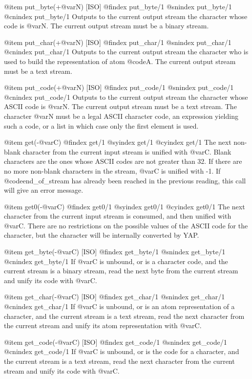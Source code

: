 {{{{{{@item put_byte(+@var{N}) [ISO]
@findex put_byte/1
@snindex put_byte/1
@cnindex put_byte/1
Outputs to the current output stream the character whose code is
@var{N}. The current output stream must be a binary stream.

@item put_char(+@var{N}) [ISO]
@findex put_char/1
@snindex put_char/1
@cnindex put_char/1
Outputs to the current output stream the character who is used to build
the representation of atom @code{A}. The current output stream must be a
text stream.

@item put_code(+@var{N}) [ISO]
@findex put_code/1
@snindex put_code/1
@cnindex put_code/1
Outputs to the current output stream the character whose ASCII code is
@var{N}. The current output stream must be a text stream. The character
@var{N} must be a legal ASCII character code, an expression yielding such
a code, or a list in which case only the first element is used.

@item get(-@var{C})
@findex get/1
@syindex get/1
@cyindex get/1
The next non-blank character from the current input stream is unified
with @var{C}. Blank characters are the ones whose ASCII codes are not
greater than 32. If there are no more non-blank characters in the
stream, @var{C} is unified with -1. If @code{end_of_stream} has already
been reached in the previous reading, this call will give an error message.

@item get0(-@var{C})
@findex get0/1
@syindex get0/1
@cyindex get0/1
The next character from the current input stream is consumed, and then
unified with @var{C}. There are no restrictions on the possible
values of the ASCII code for the character, but the character will be
internally converted by YAP.

@item get_byte(-@var{C}) [ISO]
@findex get_byte/1
@snindex get_byte/1
@cnindex get_byte/1
If @var{C} is unbound, or is a character code, and the current stream is a
binary stream, read the next byte from the current stream and unify its
code with @var{C}.

@item get_char(-@var{C}) [ISO]
@findex get_char/1
@snindex get_char/1
@cnindex get_char/1
If @var{C} is unbound, or is an atom representation of a character, and
the current stream is a text stream, read the next character from the
current stream and unify its atom representation with @var{C}.

@item get_code(-@var{C}) [ISO]
@findex get_code/1
@snindex get_code/1
@cnindex get_code/1
If @var{C} is unbound, or is the code for a character, and
the current stream is a text stream, read the next character from the
current stream and unify its code with @var{C}.

}}}}}}
